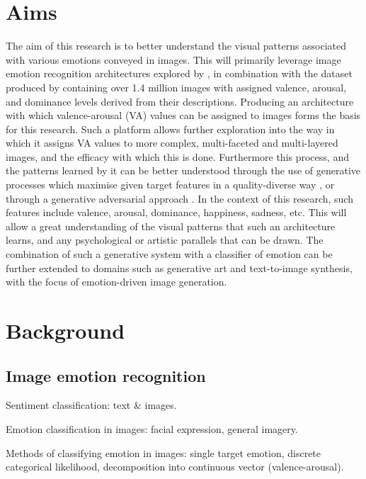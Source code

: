 \documentclass{article}
\begin{document}
\section{Aims}
The aim of this research is to better understand the visual patterns associated with various emotions conveyed in images.
This will primarily leverage image emotion recognition architectures explored by \citet{kim2018building}, in combination with the dataset produced by \citet{zhao2016predicting} containing over 1.4 million images with assigned valence, arousal, and dominance levels derived from their descriptions.
Producing an architecture with which valence-arousal (VA) values can be assigned to images forms the basis for this research.
Such a platform allows further exploration into the way in which it assigns VA values to more complex, multi-faceted and multi-layered images, and the efficacy with which this is done.
Furthermore this process, and the patterns learned by it can be better understood through the use of generative processes which maximise given target features in a quality-diverse way \citep{nguyen2015innovation, nguyen2015deep}, or through a generative adversarial approach \citep{tan2017artgan}.
In the context of this research, such features include valence, arousal, dominance, happiness, sadness, etc.
This will allow a great understanding of the visual patterns that such an architecture learns, and any psychological or artistic parallels that can be drawn.
The combination of such a generative system with a classifier of emotion can be further extended to domains such as generative art and text-to-image synthesis, with the focus of emotion-driven image generation.

\section{Background}



\subsection{Image emotion recognition}
\begin{todolist}
	\item Sentiment classification: text \& images.
	\item Emotion classification in images: facial expression, general imagery.
	\item Methods of classifying emotion in images: single target emotion, discrete categorical likelihood, decomposition into continuous vector (valence-arousal).
\end{todolist}
\end{document}

